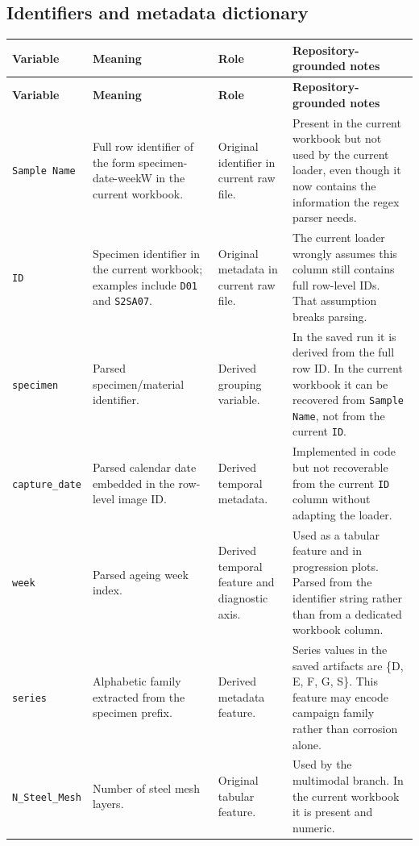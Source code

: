 \documentclass[11pt]{article}
\begin{document}
\subsection{Identifiers and metadata dictionary}

\begin{longtable}{p{} p{} p{} p{}}
\toprule
\textbf{Variable} & \textbf{Meaning} & \textbf{Role} & \textbf{Repository-grounded notes} \\
\midrule
\endfirsthead
\toprule
\textbf{Variable} & \textbf{Meaning} & \textbf{Role} & \textbf{Repository-grounded notes} \\
\midrule
\endhead
\texttt{Sample Name} & Full row identifier of the form specimen-date-weekW in the current workbook. & Original identifier in current raw file. & Present in the current workbook but not used by the current loader, even though it now contains the information the regex parser needs. \\
\texttt{ID} & Specimen identifier in the current workbook; examples include \texttt{D01} and \texttt{S2SA07}. & Original metadata in current raw file. & The current loader wrongly assumes this column still contains full row-level IDs. That assumption breaks parsing. \\
\texttt{specimen} & Parsed specimen/material identifier. & Derived grouping variable. & In the saved run it is derived from the full row ID. In the current workbook it can be recovered from \texttt{Sample Name}, not from the current \texttt{ID}. \\
\texttt{capture\_date} & Parsed calendar date embedded in the row-level image ID. & Derived temporal metadata. & Implemented in code but not recoverable from the current \texttt{ID} column without adapting the loader. \\
\texttt{week} & Parsed ageing week index. & Derived temporal feature and diagnostic axis. & Used as a tabular feature and in progression plots. Parsed from the identifier string rather than from a dedicated workbook column. \\
\texttt{series} & Alphabetic family extracted from the specimen prefix. & Derived metadata feature. & Series values in the saved artifacts are \{D, E, F, G, S\}. This feature may encode campaign family rather than corrosion alone. \\
\texttt{N\_Steel\_Mesh} & Number of steel mesh layers. & Original tabular feature. & Used by the multimodal branch. In the current workbook it is present and numeric. \\

\end{longtable}
\end{document}
